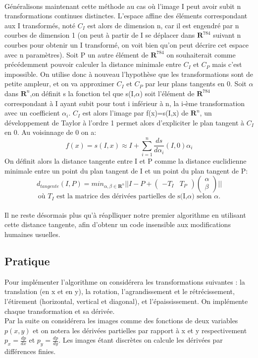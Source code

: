 \documentclass[a4paper,11pt,twoside]{report}
\begin{document}
 \\
Généralisons maintenant cette méthode au cas où l'image I peut avoir subit n transformations continues distinctes. L'espace affine des éléments correspondant aux I transformés, noté $C_{I}$ est alors de dimension n, car il est engendré par n courbes de dimension 1 (on peut à partir de I se déplacer dans $\textbf{R}^{784}$ suivant n courbes pour obtenir un I transformé, on voit bien qu'on peut décrire cet espace avec n paramètres). Soit P un autre élément de $\textbf{R}^{784}$ on souhaiterait comme précédemment pouvoir calculer la distance minimale entre $C_{I}$ et $C_{P}$ mais c'est impossible. On utilise donc à nouveau l'hypothèse que les transformations sont de petite ampleur, et on va approximer $C_{I}$ et $C_{P}$ par leur plans tangents en 0. Soit $\alpha$ dans $\textbf{R}^{n}$,on définit s la fonction tel que s(I,$\alpha$) soit l'élément de $\textbf{R}^{784}$ correspondant à I ayant subit pour tout i inférieur à n, la i-ème transformation avec un coefficient $\alpha_{i}$. $C_{I}$ est alors l'image par f(x)=s(I,x) de $\textbf{R}^{n}$, un développement de Taylor à l'ordre 1 permet alors d'expliciter le plan tangent à $C_{I}$ en 0. Au voisinnage de 0 on a:$$f(x) = s(I,x) \approx I + \sum_{i=1}^{n}\frac{ds}{d\alpha_{i}}(I,0)\alpha_{i}$$ On définit alors la distance tangente entre I et P comme la distance euclidienne minimale entre un point du plan tangent de I et un point du plan tangent de P:$$d_{tangente}(I,P)=min_{\alpha,\beta \in \textbf{R}^{n}}||I-P+\begin{pmatrix}-T_{I} & T_{P}\end{pmatrix} \begin{pmatrix}\alpha \\ \beta\end{pmatrix}||$$ $$\textrm{où $T_{I}$ est la matrice des dérivées partielles de s(I,$\alpha$) selon $\alpha$.}$$\\
Il ne reste désormais plus qu'à réaplliquer notre premier algorithme en utilisant cette distance tangente, afin d'obtenr un code insensible aux modifications humaines usuelles.

\subsection{Pratique}

Pour implémenter l'algorithme on considérera les transformations suivantes : la translation (en x et en y), la rotation, l'agrandissement et le rétrécissement, l'étirement (horizontal, vertical et diagonal), et l'épaississement. On implémente chaque transformation et sa dérivée.\\
Par la suite on considérera les images comme des fonctions de deux variables $p(x,y)$ et on notera les dérivées partielles par rapport à x et y respectivement $p_x = \frac{dp}{dx}$ et $p_y = \frac{dp}{dy}$. Les images étant discrètes on calcule les dérivées par différences finies. 
\end{document}
